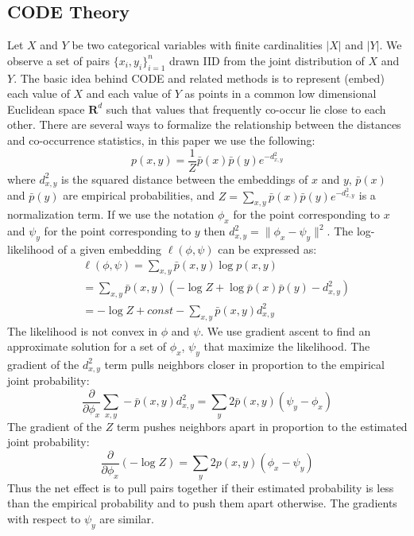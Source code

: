 \subsection{CODE Theory}
\label{sec:codethr}

Let $X$ and $Y$ be two categorical variables with finite cardinalities
$|X|$ and $|Y|$.  We observe a set of pairs $\{x_i, y_i\}_{i=1}^n$
drawn IID from the joint distribution of $X$ and $Y$.  The basic idea
behind CODE and related methods is to represent (embed) each value of
$X$ and each value of $Y$ as points in a common low dimensional
Euclidean space $\mathbf{R}^d$ such that values that frequently
co-occur lie close to each other.  There are several ways to formalize
the relationship between the distances and co-occurrence statistics, in
this paper we use the following:
\begin{equation} \label{eq:probability}
p(x,y) = \frac{1}{Z} \bar{p}(x) \bar{p}(y) e^{-d^2_{x,y}}
\end{equation}
\noindent where $d^2_{x,y}$ is the squared distance between the
embeddings of $x$ and $y$, $\bar{p}(x)$ and $\bar{p}(y)$ are empirical
probabilities, and $Z=\sum_{x,y} \bar{p}(x) \bar{p}(y) e^{-d^2_{x,y}}$ is
a normalization term.  If we use the notation $\phi_x$ for the
point corresponding to $x$ and $\psi_y$ for the point corresponding
to $y$ then $d^2_{x,y} = \|\phi_x-\psi_y\|^2$.  The log-likelihood
of a given embedding $\ell(\phi, \psi)$ can be expressed as:
\begin{eqnarray} 
&&\ell(\phi, \psi) = \sum_{x,y} \bar{p}(x,y) \log p(x,y) \label{eq:likelihood} \\
&&= \sum_{x,y} \bar{p}(x,y) (-\log Z + \log \bar{p}(x)\bar{p}(y) - d^2_{x,y}) \nonumber \\
&&= -\log Z + \mathit{const} - \sum_{x,y} \bar{p}(x,y) d^2_{x,y} \nonumber
\end{eqnarray}
The likelihood is not convex in $\phi$ and $\psi$.  We use gradient
ascent to find an approximate solution for a set of $\phi_x$, $\psi_y$
that maximize the likelihood.  The gradient of the $d^2_{x,y}$ term
pulls neighbors closer in proportion to the empirical joint
probability:
\begin{equation}
\frac{\partial}{\partial\phi_x} \sum_{x,y} -\bar{p}(x,y) d^2_{x,y} =
\sum_y 2 \bar{p}(x,y) (\psi_y - \phi_x) \label{eq:attract}
\end{equation}
The gradient of the $Z$ term pushes neighbors apart in proportion to the
estimated joint probability:
\begin{equation}
\frac{\partial}{\partial\phi_x} (-\log Z) = \sum_y 2 p(x,y) (\phi_x -
\psi_y) \label{eq:repulse}
\end{equation}
Thus the net effect is to pull pairs together if their estimated
probability is less than the empirical probability and to push them
apart otherwise.  The gradients with respect to $\psi_y$ are
similar.

